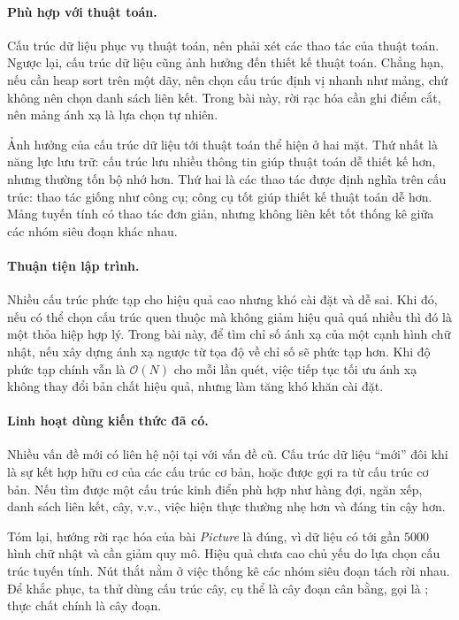 \documentclass[11pt]{article}
\newcommand{\Oh}{\mathcal{O}}
\begin{document}
\paragraph{Phù hợp với thuật toán.}
Cấu trúc dữ liệu phục vụ thuật toán, nên phải xét các thao tác của thuật toán.
Ngược lại, cấu trúc dữ liệu cũng ảnh hưởng đến thiết kế thuật toán. Chẳng hạn,
nếu cần heap sort trên một dãy, nên chọn cấu trúc định vị nhanh như mảng, chứ
không nên chọn danh sách liên kết. Trong bài này, rời rạc hóa cần ghi điểm
cắt, nên mảng ánh xạ là lựa chọn tự nhiên.

Ảnh hưởng của cấu trúc dữ liệu tới thuật toán thể hiện ở hai mặt. Thứ nhất là
năng lực lưu trữ: cấu trúc lưu nhiều thông tin giúp thuật toán dễ thiết kế
hơn, nhưng thường tốn bộ nhớ hơn. Thứ hai là các thao tác được định nghĩa trên
cấu trúc: thao tác giống như công cụ; công cụ tốt giúp thiết kế thuật toán dễ
hơn. Mảng tuyến tính có thao tác đơn giản, nhưng không liên kết tốt thống kê
giữa các nhóm siêu đoạn khác nhau.

\paragraph{Thuận tiện lập trình.}
Nhiều cấu trúc phức tạp cho hiệu quả cao nhưng khó cài đặt và dễ sai. Khi đó,
nếu có thể chọn cấu trúc quen thuộc mà không giảm hiệu quả quá nhiều thì đó là
một thỏa hiệp hợp lý. Trong bài này, để tìm chỉ số ánh xạ của một cạnh hình
chữ nhật, nếu xây dựng ánh xạ ngược từ tọa độ về chỉ số sẽ phức tạp hơn. Khi
độ phức tạp chính vẫn là \(\Oh(N)\) cho mỗi lần quét, việc tiếp tục tối ưu ánh
xạ không thay đổi bản chất hiệu quả, nhưng làm tăng khó khăn cài đặt.

\paragraph{Linh hoạt dùng kiến thức đã có.}
Nhiều vấn đề mới có liên hệ nội tại với vấn đề cũ. Cấu trúc dữ liệu ``mới''
đôi khi là sự kết hợp hữu cơ của các cấu trúc cơ bản, hoặc được gợi ra từ cấu
trúc cơ bản. Nếu tìm được một cấu trúc kinh điển phù hợp như hàng đợi, ngăn
xếp, danh sách liên kết, cây, v.v., việc hiện thực thường nhẹ hơn và đáng tin
cậy hơn.

Tóm lại, hướng rời rạc hóa của bài \textit{Picture} là đúng, vì dữ liệu có tới
gần \(5000\) hình chữ nhật và cần giảm quy mô. Hiệu quả chưa cao chủ yếu do
lựa chọn cấu trúc tuyến tính. Nút thắt nằm ở việc thống kê các nhóm siêu đoạn
tách rời nhau. Để khắc phục, ta thử dùng cấu trúc cây, cụ thể là cây đoạn cân
bằng, gọi là ; thực chất chính là cây đoạn.
\end{document}
